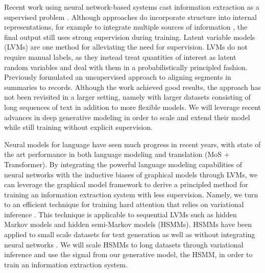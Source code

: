 \documentclass[11pt]{article}
\begin{document}
Recent work using neural network-based systems cast information extraction
as a supervised problem
\citep{wiseman2017d2t,dossantos2015classification}.
Although approaches do incorporate structure into internal representations,
for example to integrate multiple sources of information \citep{weissenborn17},
the final output still uses strong supervision during training.
Latent variable models (LVMs) are one method for alleviating the need for supervision.
LVMs do not require manual labels, as they instead treat quantities of interest
as latent random variables and deal with them in a probabilistically principled 
fashion.
Previously \citet{liang2009semalign} formulated an unsupervised approach
to aligning segments in summaries to records. Although the work achieved
good results, the approach has not been revisited in a larger setting,
namely with larger datasets consisting of long sequences of text 
in addition to more flexible models.
We will leverage recent advances in deep generative modeling in order to
scale and extend their model while still training without explicit supervision.

Neural models for language have seen much progress in recent years,
with state of the art performance in both language modeling and translation \citep{?} (MoS + Transformer).
By integrating the powerful language modeling capabilities of neural networks with
the inductive biases of graphical models through LVMs,
we can leverage the graphical model framework to derive a principled method
for training an information extraction system with less supervision.
Namely, we turn to an efficient technique for training hard attention 
that relies on variational inference \citep{deng2018attn}.
This technique is applicable to sequential LVMs such as hidden Markov models 
and hidden semi-Markov models (HSMMs).
HSMMs have been applied to small scale datasets for text generation \citep{wiseman2018template}
as well as without integrating neural networks \citep{liang2009semalign}.
We will scale HSMMs to long datasets through variational inference and use
the signal from our generative model, the HSMM, in order to train an information extraction system.
\end{document}
